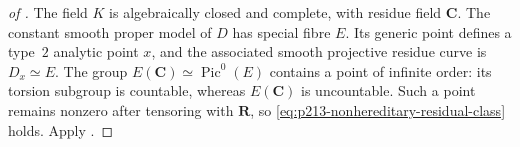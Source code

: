 \begin{proof}[of
]
The field $K$ is algebraically closed and complete, with residue field
$\mathbf C$.  The constant smooth proper model of $D$ has special fibre
$E$.  Its generic point defines a type~$2$ analytic point $x$, and the
associated smooth projective residue curve is $D_x\simeq E$.  The group
$E(\mathbf C)\simeq\operatorname{Pic}^0(E)$ contains a point of infinite
order: its torsion subgroup is countable, whereas $E(\mathbf C)$ is
uncountable.  Such a point remains nonzero after tensoring with
$\mathbf R$, so \eqref{eq:p213-nonhereditary-residual-class} holds.  Apply
.
\end{proof}
